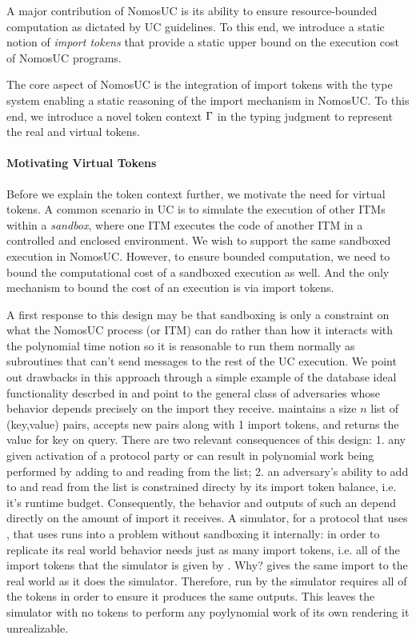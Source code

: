 A major contribution of NomosUC is its ability to ensure resource-bounded computation
as dictated by UC guidelines.
To this end, we introduce a static notion of \emph{import tokens} that provide a static upper
bound on the execution cost of NomosUC programs.

The core aspect of NomosUC is the integration of import tokens with the type system
enabling a static reasoning of the import mechanism in NomosUC.
To this end, we introduce a novel token context $\Gamma$ in the typing judgment to
represent the real and virtual tokens.

\paragraph*{\textbf{Motivating Virtual Tokens}}
Before we explain the token context further, we motivate the need for virtual tokens.
A common scenario in UC is to simulate the execution of other ITMs within a \emph{sandbox},
where one ITM executes the code of another ITM in a controlled and enclosed environment.
We wish to support the same sandboxed execution in NomosUC.
However, to ensure bounded computation, we need to bound the computational cost of a
sandboxed execution as well.
And the only mechanism to bound the cost of an execution is via import tokens.

A first response to this design may be that sandboxing is only a constraint
on what the NomosUC process (or ITM) can do rather than how it interacts with 
the polynomial time notion so it is reasonable to run them normally as subroutines 
that can't send messages to the rest of the UC execution. 
We point out drawbacks in this approach through a simple example of the database
ideal functionality \Fdb descrbed in \cite{hoffheinzpoly} and point to the general
class of adversaries whose behavior depends precisely on the import they receive.
\Fdb maintains a size $n$ list of (key,value) pairs, accepts new pairs along with 1 import tokens, and returns the value
for key on query. There are two relevant consequences of this design: 1. any given activation 
of a protocol party or \Adv can result in polynomial work being performed by adding to and 
reading from the list; 2. an adversary's ability to add to and read from the list is constrained
directy by its import token balance, i.e. it's runtime budget. 
Consequently, the behavior and outputs of such an \Adv depend directly on the amount of 
import it receives. A simulator, for a protocol that uses \Fdb, that uses \Adv runs into a 
problem without sandboxing it internally: in order to replicate its real world
behavior \Adv needs just as many import tokens, i.e. all of the import tokens that the 
simulator is given by \Z. Why? \Z gives the same import to the real world \Adv as it does
the simulator. Therefore, \Adv run by the simulator requires all of the tokens in order to 
ensure it produces the same outputs. This leaves the simulator with no tokens to perform
any poylynomial work of its own rendering it unrealizable. 


